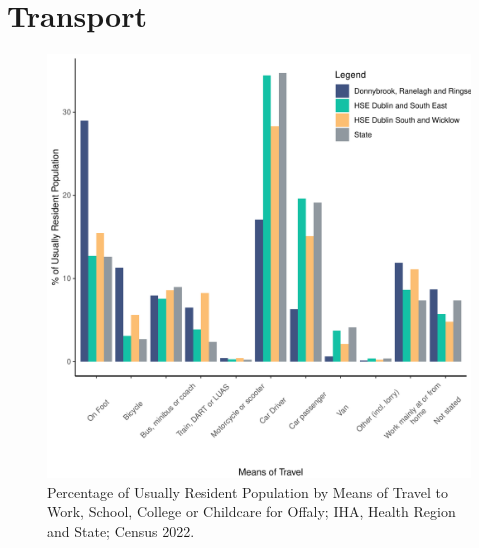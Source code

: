 \documentclass{article}
\begin{document}
\section{Transport}\label{sect:Trans}
\begin{figure}[H]
	\centering
	\includegraphics[width = 120mm]{../figures/TravelED.pdf}
	\caption{Percentage of Usually Resident Population by Means of Travel to Work, School, College or Childcare for Offaly; IHA, Health Region and State; Census 2022.}
	\label{fig:vbnv}
	\end{figure}
\end{document}
